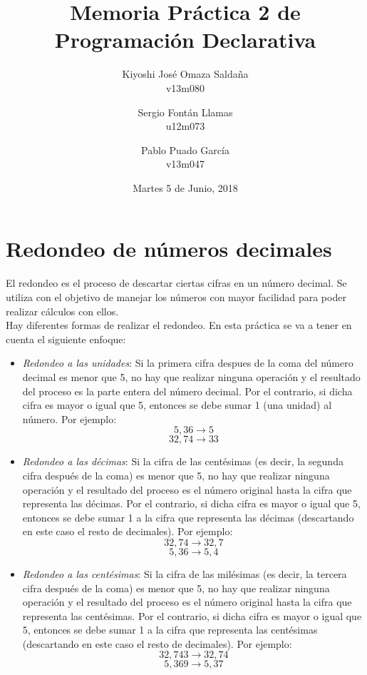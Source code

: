 \documentclass[11pt, a4paper]{article}
\title{\Huge Memoria Práctica 2 de Programación Declarativa}
\date{Martes 5 de Junio, 2018}
\author{Kiyoshi José Omaza Saldaña\\ v13m080
\and Sergio Fontán Llamas\\ u12m073
\and Pablo Puado García\\ v13m047}
\begin{document}
\begin{titlepage}
\maketitle
\end{titlepage}

\tableofcontents
\newpage
{}
\section{Redondeo de números decimales}
El redondeo es el proceso de descartar ciertas cifras en un número decimal. Se utiliza
con el objetivo de manejar los números con mayor facilidad para poder realizar
cálculos con ellos.\\
Hay diferentes formas de realizar el redondeo. En esta práctica se va a tener en
cuenta el siguiente enfoque:\\
\begin{itemize}
 \item \textit{Redondeo a las unidades}: Si la primera cifra despues de la coma del número decimal es menor que 5, no hay que realizar ninguna operación y el resultado del proceso es la parte entera del número decimal. Por el contrario, si dicha cifra es mayor o igual que 5, entonces se debe sumar 1 (una unidad) al número. Por ejemplo:
 $$5,36 \rightarrow 5$$
 $$32,74 \rightarrow 33$$
 \item \textit{Redondeo a las décimas}: Si la cifra de las centésimas (es decir, la segunda cifra después de la coma) es menor que 5, no hay que realizar ninguna operación y el resultado del proceso es el número original hasta la cifra que representa las décimas. Por el contrario, si dicha cifra es mayor o igual que 5, entonces se debe sumar 1 a la cifra que representa las décimas (descartando en este caso el resto de decimales). Por ejemplo:
 $$32,74 \rightarrow 32,7$$
 $$5,36 \rightarrow 5,4$$
 \item \textit{Redondeo a las centésimas}: Si la cifra de las milésimas (es decir, la tercera cifra después de la coma) es menor que 5, no hay que realizar ninguna operación y el resultado del proceso es el número original hasta la cifra que representa las centésimas. Por el contrario, si dicha cifra es mayor o igual que 5, entonces se debe sumar 1 a la cifra que representa las centésimas (descartando en este caso el resto de decimales). Por ejemplo:
 $$32,743 \rightarrow 32,74$$
 $$5,369 \rightarrow 5,37$$
\end{itemize}
\end{document}
